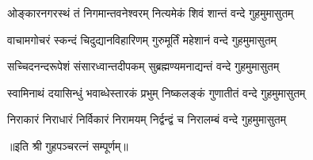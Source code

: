 
\twolineshloka
{ओङ्कारनगरस्थं तं निगमान्तवनेश्वरम्}
{नित्यमेकं शिवं शान्तं वन्दे गुहमुमासुतम्}

\twolineshloka
{वाचामगोचरं स्कन्दं चिदुद्यानविहारिणम्}
{गुरुमूर्तिं महेशानं वन्दे गुहमुमासुतम्}

\twolineshloka
{सच्चिदनन्दरूपेशं संसारध्वान्तदीपकम्}
{सुब्रह्मण्यमनाद्यन्तं वन्दे गुहमुमासुतम्}

\twolineshloka
{स्वामिनाथं दयासिन्धुं भवाब्धेस्तारकं प्रभुम्}
{निष्कलङ्कं गुणातीतं वन्दे गुहमुमासुतम्}

\twolineshloka
{निराकारं निराधारं निर्विकारं निरामयम्}
{निर्द्वन्द्वं च निरालम्बं वन्दे गुहमुमासुतम्}

॥इति श्री गुहपञ्चरत्नं सम्पूर्णम्॥

